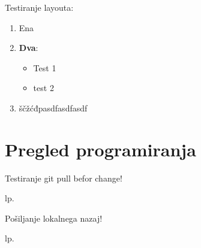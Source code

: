 
Testiranje layouta:

\begin{enumerate}
\item Ena
\item \textbf{Dva}:
  \begin{itemize}[style]
  \item Test 1
  \item test 2
  \end{itemize}
\item ščžćđpasdfasdfasdf
\end{enumerate}

\chapter{Pregled programiranja}
\label{chap:Pregled_programiranja}

Testiranje git pull befor change!

lp.

Pošiljanje lokalnega nazaj!

lp.




